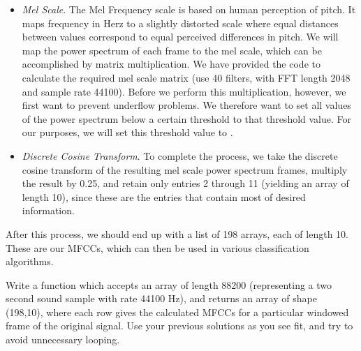 \begin{itemize}
\item \emph{Mel Scale}. The Mel Frequency scale is based on human perception of pitch. It maps frequency
in Herz to a slightly distorted scale where equal distances between values correspond to equal perceived
differences in pitch. We will map the power spectrum of each frame to the mel scale, which can be
accomplished by matrix multiplication. We have provided the code to calculate the required mel scale
matrix (use 40 filters, with FFT length 2048 and sample rate 44100).
Before we perform this multiplication, however, we first want to prevent underflow problems. We
therefore want to set all values of the power spectrum below a certain threshold to that threshold value.
For our purposes, we will set this threshold value to .

\item \emph{Discrete Cosine Transform}. To complete the process, we take the discrete cosine transform
of the resulting mel scale power spectrum frames, multiply the result by 0.25, and retain only entries 2
through 11 (yielding an array of length 10), since these are the entries that contain most of desired
information.
\end{itemize}
After this process, we should end up with a list of 198 arrays, each of length 10. These are our MFCCs,
which can then be used in various classification algorithms.

\begin{problem}
Write a function  which accepts an array of length 88200 (representing a two second sound sample
with rate 44100 Hz), and returns an array of shape (198,10), where each row gives the calculated MFCCs for
a particular windowed frame of the original signal. Use your previous solutions as you see fit, and try to
avoid unnecessary looping.
\end{problem}

